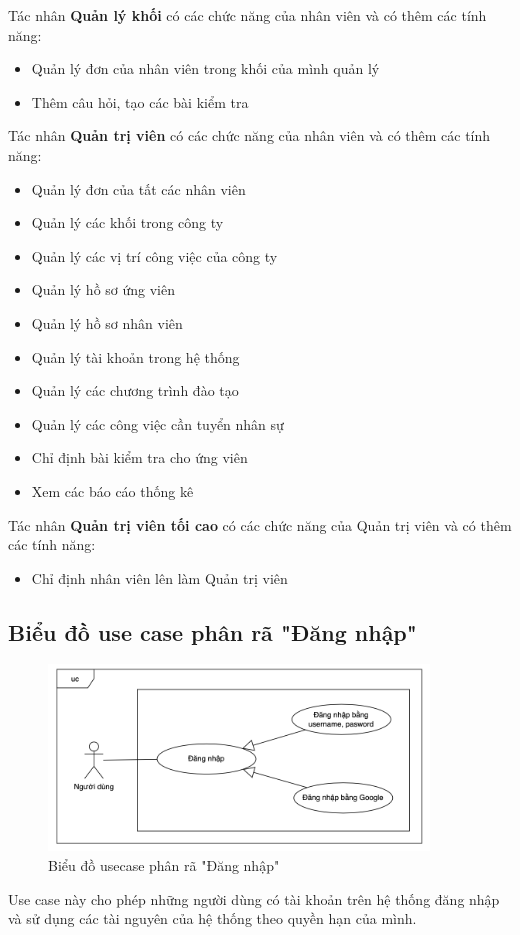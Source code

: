 \documentclass[../DoAn.tex]{subfiles}
\begin{document}
\noindent Tác nhân \textbf{Quản lý khối} có các chức năng của nhân viên và có thêm các tính năng:
\begin{itemize}
\item Quản lý đơn của nhân viên trong khối của mình quản lý
\item Thêm câu hỏi, tạo các bài kiểm tra
\end{itemize}

\noindent Tác nhân \textbf{Quản trị viên} có các chức năng của nhân viên và có thêm các tính năng:
\begin{itemize}
\item Quản lý đơn của tất các nhân viên
\item Quản lý các khối trong công ty
\item Quản lý các vị trí công việc của công ty
\item Quản lý hồ sơ ứng viên
\item Quản lý hồ sơ nhân viên
\item Quản lý tài khoản trong hệ thống
\item Quản lý các chương trình đào tạo
\item Quản lý các công việc cần tuyển nhân sự
\item Chỉ định bài kiểm tra cho ứng viên
\item Xem các báo cáo thống kê
\end{itemize}

\noindent Tác nhân \textbf{Quản trị viên tối cao} có các chức năng của Quản trị viên và có thêm các tính năng:
\begin{itemize}
\item Chỉ định nhân viên lên làm Quản trị viên
\end{itemize}

\subsection{Biểu đồ use case phân rã "Đăng nhập"}
\label{subsection:2.2.2}
\begin{figure}[h]
    \centering
    \includegraphics[width=0.9\textwidth]{Hinhve/UC_DangNhap.png}
    \caption{Biểu đồ usecase phân rã "Đăng nhập"}
\end{figure}
Use case này cho phép những người dùng có tài khoản trên hệ thống đăng nhập và sử dụng các tài nguyên của hệ thống theo quyền hạn của mình.
\end{document}
